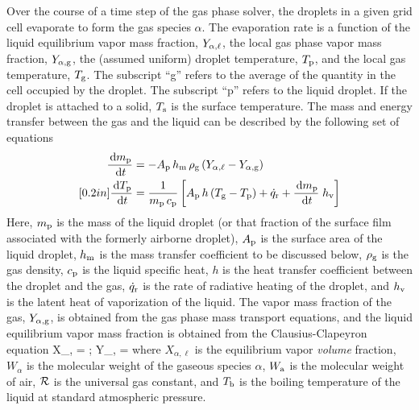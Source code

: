 Over the course of a time step of the gas phase solver, the droplets in a given grid cell evaporate to form the gas species $\alpha$. The evaporation rate is a function of the liquid equilibrium vapor mass fraction, $Y_{\rm \alpha,\ell}$, the local gas phase vapor mass fraction, $Y_{\rm \alpha,g}$, the (assumed uniform) droplet temperature, $T_{\rm p}$, and the local gas temperature, $T_{\rm g}$. The subscript ``g'' refers to the average of the quantity in the cell occupied by the droplet. The subscript ``p'' refers to the liquid droplet. If the droplet is attached to a solid, $T_{\rm s}$ is the surface temperature. The mass and energy transfer between the gas and the liquid can be described by the following set of equations~\cite{Cheremisinoff:1}
\begin{align}
\frac{\,\mathrm{d} m_{\rm p}}{\,\mathrm{d} t} & = - A_{\rm p} \, h_{\rm m} \, \rho_{\rm g} \, (Y_{\alpha,\ell} - Y_{\rm \alpha, g}) \\ [0.2in]
\frac{\,\mathrm{d} T_{\rm p}}{\,\mathrm{d} t} & = \frac{1}{m_{\rm p} \, c_{\rm p}}  \left[ A_{\rm p} \, h  \, (T_{\rm g}-T_{\rm p}) + \dot{q}_{\rm r} + \frac{\,\mathrm{d} m_{\rm p}}{\,\mathrm{d} t} \; h_{\rm v} \right] \label{droplet_temp}
\end{align}
Here, $m_{\rm p}$ is the mass of the liquid droplet (or that fraction of the surface film associated with the formerly airborne droplet), $A_{\rm p}$ is the surface area of the liquid droplet, $h_{\rm m}$ is the mass transfer coefficient to be discussed below, $\rho_{\rm g}$ is the gas density, $c_{\rm p}$ is the liquid specific heat, $h$ is the heat transfer coefficient between the droplet and the gas, $\dot{q}_{\rm r}$ is the rate of radiative heating of the droplet, and $h_{\rm v}$ is the latent heat of vaporization of the liquid. The vapor mass fraction of the gas, $Y_{\rm \alpha,g}$, is obtained from the gas phase mass transport equations, and the liquid equilibrium vapor mass fraction is obtained from the Clausius-Clapeyron equation
\be X_{\rm \alpha,\ell} = \exp {}  \quad ; \quad
      Y_{\rm \alpha,\ell} =   \label{clausius_clapeyron} \ee
where $X_{\alpha,\ell}$ is the equilibrium vapor {\em volume} fraction, $W_{\alpha}$ is the molecular weight of the gaseous species $\alpha$, $W_{\rm a}$ is the molecular weight of air, $\cal R$ is the universal gas constant, and $T_{\rm b}$ is the boiling temperature of the liquid at standard atmospheric pressure.

